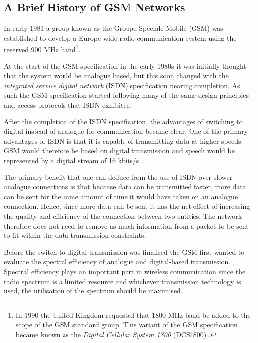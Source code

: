 \subsection{A Brief History of GSM Networks}
\label{sec:gsmhistory}
In early 1981 a group known as the Groupe Speciale Mobile (GSM) was established to develop a Europe-wide radio communication system using the reserved 900 MHz band\footnote{In 1990 the United Kingdom requested that 1800 MHz band be added to the scope of the GSM standard group. This variant of the GSM specification became known as the \emph{Digital Cellular System 1800} (DCS1800) \cite{GSM92,Karen2004}.}\cite{GSM92,Karen2004}.

At the start of the GSM specification in the early 1980s it was initially thought that the system would be analogue based, but this soon changed with the \emph{integrated service digital network} (ISDN) specification nearing completion. As such the GSM specification started following many of the same design principles and access protocols that ISDN exhibited\cite{Karen2004,GSM92,GSMArchitectureProtocolsServices}.

After the completion of the ISDN specification, the advantages of switching to digital instead of analogue for communication became clear. One of the primary advantages of ISDN is that it is capable of transmitting data at higher speeds. GSM would therefore be based on digital transmission and speech would be represented by a digital stream of 16 kbits/s \cite{Karen2004,GSM92,GSMArchitectureProtocolsServices}.

The primary benefit that one can deduce from the use of ISDN over slower analogue connections is that because data can be transmitted faster, more data can be sent for the same amount of time it would have taken on an analogue connection\cite{Karen2004,GSM92,GSMArchitectureProtocolsServices}. Hence, since more data can be sent it has the net effect of increasing the quality and efficiency of the connection between two entities. The network therefore does not need to remove as much information from a packet to be sent to fit within the data transmission constraints\cite{Karen2004,GSM92,GSMArchitectureProtocolsServices}.

Before the switch to digital transmission was finalised the GSM first wanted to evaluate the spectral efficiency of analogue and digital-based transmission\cite{Karen2004,GSM92,GSMArchitectureProtocolsServices}. Spectral efficiency plays an important part in wireless communication since the radio spectrum is a limited resource and whichever transmission technology is used, the utilisation of the spectrum should be maximised\cite{Karen2004,GSM92,GSMArchitectureProtocolsServices}. 

